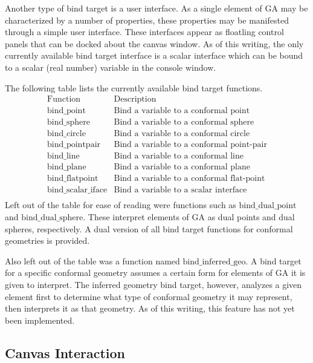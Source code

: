 \documentclass[12pt]{article}
\begin{document}
Another type of bind target is a user interface.  As a single element of GA may be characterized
by a number of properties, these properties may be manifested through a simple user interface.
These interfaces appear as floatling control panels that can be docked about the canvas window.
As of this writing, the only currently available bind target interface is a scalar interface which can
be bound to a scalar (real number) variable in the console window.

The following table lists the currently available bind target functions.
\begin{equation*}
\begin{array}{ll}
\mbox{Function} & \mbox{Description} \\
\hline
\mbox{bind\_point} & \mbox{Bind a variable to a conformal point} \\
\mbox{bind\_sphere} & \mbox{Bind a variable to a conformal sphere} \\
\mbox{bind\_circle} & \mbox{Bind a variable to a conformal circle} \\
\mbox{bind\_pointpair} & \mbox{Bind a variable to a conformal point-pair} \\
\mbox{bind\_line} & \mbox{Bind a variable to a conformal line} \\
\mbox{bind\_plane} & \mbox{Bind a variable to a conformal plane} \\
\mbox{bind\_flatpoint} & \mbox{Bind a variable to a conformal flat-point} \\
\mbox{bind\_scalar\_iface} & \mbox{Bind a variable to a scalar interface} \\
\end{array}
\end{equation*}
Left out of the table for ease of reading were functions such as $\mbox{bind\_dual\_point}$
and $\mbox{bind\_dual\_sphere}$.  These interpret elements of GA as dual points and dual
spheres, respectively.  A dual version of all bind target functions for conformal geometries
is provided.

Also left out of the table was a function named $\mbox{bind\_inferred\_geo}$.
A bind target for a specific conformal geometry assumes a certain form for
elements of GA it is given to interpret.  The inferred geometry bind target, however,
analyzes a given element first to determine what type of conformal geometry it
may represent, then interprets it as that geometry.  As of this writing, this
feature has not yet been implemented.

\subsection{Canvas Interaction}
\end{document}
